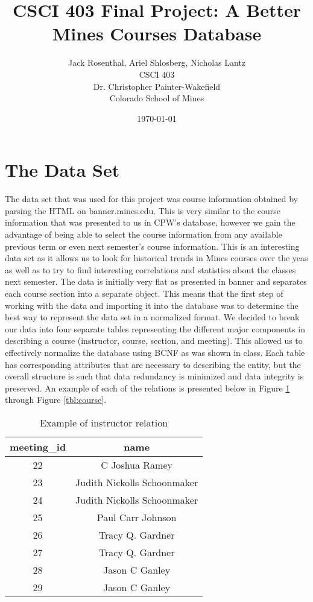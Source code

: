 \documentclass[12pt,letterpaper,titlepage]{article}
\title{CSCI 403 Final Project:
       A Better Mines Courses Database}
\date{\today}
\author{Jack Rosenthal, Ariel Shlosberg, Nicholas Lantz\\
        \small CSCI 403\\
        \small Dr. Christopher Painter-Wakefield\\
        \small Colorado School of Mines}
\begin{document}
\maketitle

\section{The Data Set}
The data set that was used for this project was course information obtained by parsing the HTML on banner.mines.edu. This is very similar to the course information that was presented to us in CPW's database, however we gain the advantage of being able to select the course information from any available previous term or even next semester's course information. This is an interesting data set as it allows us to look for historical trends in Mines courses over the yeas as well as to try to find interesting correlations and statistics about the classes next semester. The data is initially very flat as presented in banner and separates each course section into a separate object. This means that the first step of working with the data and importing it into the database was to determine the best way to represent the data set in a normalized format. We decided to break our data into four separate tables representing the different major components in describing a course (instructor, course, section, and meeting). This allowed us to effectively normalize the database using BCNF as was shown in class. Each table has corresponding attributes that are necessary to describing the entity, but the overall structure is such that data redundancy is minimized and data integrity is preserved. An example of each of the relations is presented below in Figure \ref{tbl:instructor} through Figure \ref{tbl:course}.

\begin{table}[H]
\centering
\begin{tabular}{|c|c|}
\hline
meeting\_id & name \\ \hline
22 & C Joshua Ramey \\ \hline
23 & Judith Nickolls Schoonmaker \\ \hline
24 & Judith Nickolls Schoonmaker \\ \hline
25 & Paul Carr Johnson \\ \hline
26 & Tracy Q. Gardner \\ \hline
27 & Tracy Q. Gardner \\ \hline
28 & Jason C Ganley \\ \hline
29 & Jason C Ganley \\ \hline
\end{tabular}
\caption{\label{tbl:instructor} Example of instructor relation}
\end{table}
\end{document}
